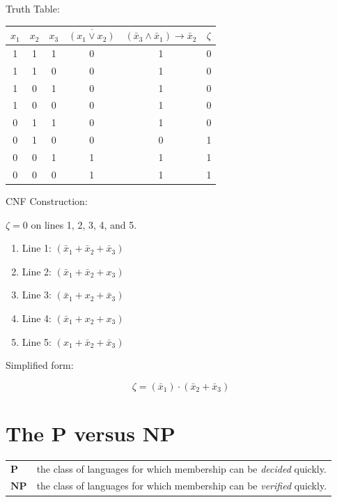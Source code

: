 \documentclass[12pt,a4paper,openany]{article}
\begin{document}
Truth Table:

\begin{center}
\begin{tabular}{|c|c|c|c|c|c|}
\hline
$x_1$ & $x_2$ & $x_3$ & $\overline{(x_1 \lor x_2)}$ & $(\bar{x}_3 \land \bar{x}_1) \to \bar{x}_2$ & $\zeta$ \\
\hline
1 & 1 & 1 & 0 & 1 & 0 \\
\hline
1 & 1 & 0 & 0 & 1 & 0 \\
\hline
1 & 0 & 1 & 0 & 1 & 0 \\
\hline
1 & 0 & 0 & 0 & 1 & 0 \\
\hline
0 & 1 & 1 & 0 & 1 & 0 \\
\hline
0 & 1 & 0 & 0 & 0 & 1 \\
\hline
0 & 0 & 1 & 1 & 1 & 1 \\
\hline
0 & 0 & 0 & 1 & 1 & 1 \\
\hline
\end{tabular}
\end{center}

CNF Construction:

$\zeta = 0$ on lines 1, 2, 3, 4, and 5.

\begin{enumerate}
\item Line 1: $(\bar{x}_1 + \bar{x}_2 + \bar{x}_3)$
\item Line 2: $(\bar{x}_1 + \bar{x}_2 + x_3)$
\item Line 3: $(\bar{x}_1 + x_2 + \bar{x}_3)$
\item Line 4: $(\bar{x}_1 + x_2 + x_3)$
\item Line 5: $(x_1 + \bar{x}_2 + \bar{x}_3)$
\end{enumerate}

Simplified form:

\[
\zeta = (\bar{x}_1) \cdot (\bar{x}_2 + \bar{x}_3)
\]

\section{The P versus NP}

\begin{center}
\begin{tabular}{ll}
$\mathbf{P}$ & the class of languages for which membership can be \emph{decided} quickly. \\
$\mathbf{NP}$ & the class of languages for which membership can be \emph{verified} quickly. \\
\end{tabular}
\end{center}
\end{document}
